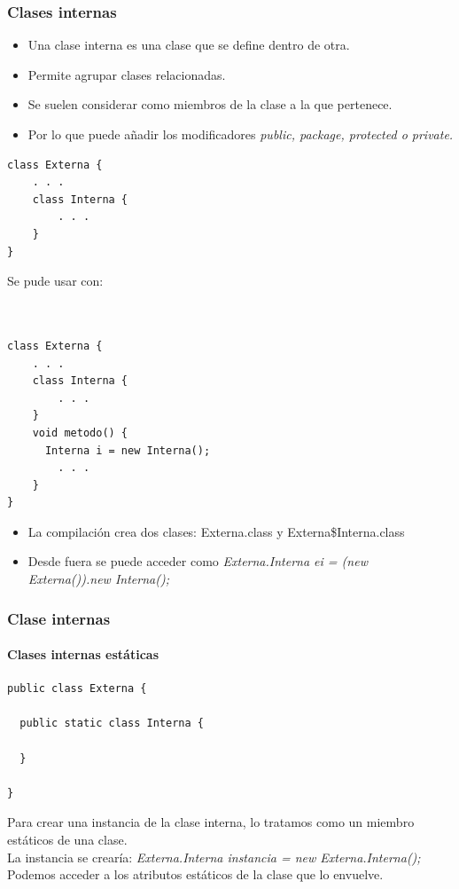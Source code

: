 \documentclass{beamer}
\begin{document}
\begin{frame}[fragile]
\frametitle{Clases internas}
\begin{footnotesize}
\begin{itemize}[<+->]
\item Una clase interna es una clase que se define dentro de otra.
\item Permite agrupar clases relacionadas.
\item Se suelen considerar como miembros de la clase a la que pertenece.
\item Por lo que puede  añadir los modificadores \emph{public, package, protected o private.}
\end{itemize}
\end{footnotesize}
\pause
\begin{small}
\begin{multicols}{2}
\begin{verbatim}
class Externa {
    . . .
    class Interna {
        . . .
    }
}
\end{verbatim}
Se pude usar con:
\begin{verbatim}


class Externa {
    . . .
    class Interna {
        . . .
    }
    void metodo() {
      Interna i = new Interna();
        . . .
    }
}
\end{verbatim}
\end{multicols}
\end{small}
\pause
\begin{footnotesize}
\begin{itemize}
\item La compilación crea dos clases: Externa.class y Externa\$Interna.class
\item Desde fuera se puede acceder como \emph{Externa.Interna ei = (new Externa()).new Interna();}
\end{itemize}\end{footnotesize}
\end{frame}

\begin{frame}[fragile]
\frametitle{Clase internas}
\framesubtitle{Clases internas estáticas}
\begin{verbatim}
public class Externa {

  public static class Interna {

  }

}
\end{verbatim}
\pause
Para crear una instancia de la clase interna, lo tratamos como un miembro estáticos de una clase.\\
\pause
La instancia se crearía:
\pause
\emph{Externa.Interna instancia = new Externa.Interna();}\\
Podemos acceder a los atributos estáticos de la clase que lo envuelve.
\end{frame}
\end{document}
